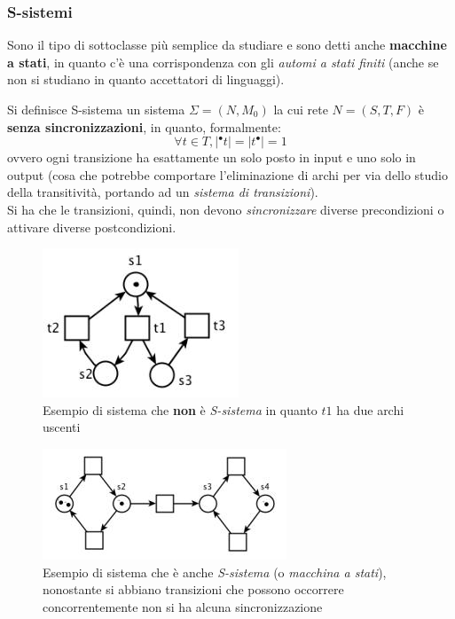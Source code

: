 \documentclass[a4paper,12pt, oneside]{book}
\begin{document}
\subsubsection{S-sistemi}
Sono il tipo di sottoclasse più semplice da studiare e sono detti anche
\textbf{macchine a stati}, in quanto c'è una corrispondenza con gli
\textit{automi a stati finiti} (anche se non si studiano in quanto accettatori
di linguaggi).
\begin{definizione}
  Si definisce S-sistema un sistema $\Sigma = (N,M_0)$ la cui rete $N=(S,T,F)$ è
  \textbf{senza sincronizzazioni}, in quanto, formalmente:
  \[\forall t\in T, |^\bullet t|=|t^\bullet|=1\]
  ovvero ogni transizione ha esattamente un solo posto in input e uno solo in
  output (cosa che potrebbe comportare l'eliminazione di archi per via dello
  studio della transitività, portando ad un \textit{sistema di transizioni}).\\
  Si ha che le transizioni, quindi, non devono \textit{sincronizzare} diverse
  precondizioni o attivare diverse postcondizioni.
  \begin{figure}[H]
    \centering
    \includegraphics[scale = 0.7]{img/ssi.jpg}
    \caption{Esempio di sistema che \textbf{non} è \emph{S-sistema} in quanto
      $t1$ ha due archi uscenti}
  \end{figure}
  \begin{figure}[H]
    \centering
    \includegraphics[scale = 0.6]{img/ssi2.jpg}
    \caption{Esempio di sistema che è anche \emph{S-sistema} (o
      \emph{macchina a stati}), nonostante si abbiano transizioni che possono
      occorrere concorrentemente non si ha alcuna sincronizzazione} 
  \end{figure}
\end{definizione}
\end{document}
